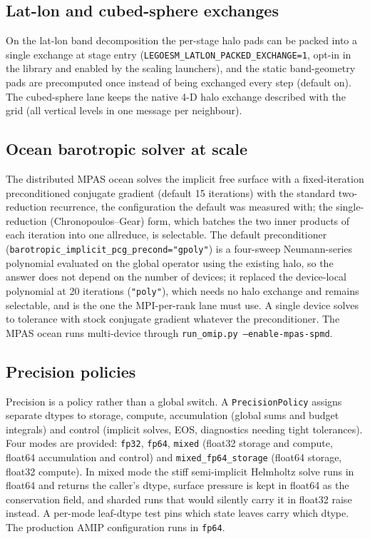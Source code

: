 \documentclass[11pt,a4paper]{article}
\begin{document}
\subsection{Lat-lon and cubed-sphere exchanges}
On the lat-lon band decomposition the per-stage halo pads can be packed into a single exchange at stage entry (\texttt{LEGOESM\_LATLON\_PACKED\_EXCHANGE=1}, opt-in in the library and enabled by the scaling launchers), and the static band-geometry pads are precomputed once instead of being exchanged every step (default on).  The cubed-sphere lane keeps the native 4-D halo exchange described with the grid (all vertical levels in one message per neighbour).

\subsection{Ocean barotropic solver at scale}
The distributed MPAS ocean solves the implicit free surface with a fixed-iteration preconditioned conjugate gradient (default 15 iterations) with the standard two-reduction recurrence, the configuration the default was measured with; the single-reduction (Chronopoulos--Gear) form, which batches the two inner products of each iteration into one allreduce, is selectable.  The default preconditioner (\texttt{barotropic\_implicit\_pcg\_precond="gpoly"}) is a four-sweep Neumann-series polynomial evaluated on the global operator using the existing halo, so the answer does not depend on the number of devices; it replaced the device-local polynomial at 20 iterations (\texttt{"poly"}), which needs no halo exchange and remains selectable, and is the one the MPI-per-rank lane must use.  A single device solves to tolerance with stock conjugate gradient whatever the preconditioner.  The MPAS ocean runs multi-device through \texttt{run\_omip.py --enable-mpas-spmd}.

\subsection{Precision policies}
Precision is a policy rather than a global switch.  A \texttt{PrecisionPolicy} assigns separate dtypes to storage, compute, accumulation (global sums and budget integrals) and control (implicit solves, EOS, diagnostics needing tight tolerances).  Four modes are provided: \texttt{fp32}, \texttt{fp64}, \texttt{mixed} (float32 storage and compute, float64 accumulation and control) and \texttt{mixed\_fp64\_storage} (float64 storage, float32 compute).  In mixed mode the stiff semi-implicit Helmholtz solve runs in float64 and returns the caller's dtype, surface pressure is kept in float64 as the conservation field, and sharded runs that would silently carry it in float32 raise instead.  A per-mode leaf-dtype test pins which state leaves carry which dtype.  The production AMIP configuration runs in \texttt{fp64}.
\end{document}

